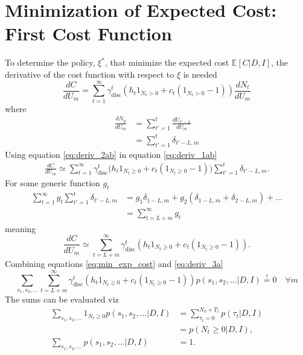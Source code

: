\section{Minimization of Expected Cost: First Cost Function}
\label{app:deriva}
To determine the policy, $\xi^*$, that minimize the expected cost $\mathbb{E}[C|D,I]$, the derivative of the cost function with respect to $\xi$ is needed
\begin{equation}
		\frac{dC}{dU_m} = \sum_{t=1}^{\infty} \gamma_{\text{disc}}^{t} \left( h_t 1_{N_t> 0} + c_t (1_{N_t> 0}-1) \right)\frac{dN_t}{dU_m}
	\label{eq:deriv_1ab}
\end{equation}
where
\begin{equation}
	\begin{split}
		\frac{dN_q}{dU_m} &= \sum_{t'=1}^t\frac{dU_{t'-L}}{dU_m}\\
		& = \sum_{t'=1}^t\delta_{t'-L,m}
	\label{eq:deriv_2ab}
	\end{split}
\end{equation}
Using equation \eqref{eq:deriv_2ab} in equation \eqref{eq:deriv_1ab} 
\begin{equation}
	\begin{split}
		\frac{dC}{dU_m} \simeq \sum_{t=1}^{\infty}\gamma_{\text{disc}}^{t}\bigg(h_t1_{N_t\geq 0}+c_t(1_{N_t\geq 0}-1)\bigg)\sum_{t'=1}^t\delta_{t'-L,m}.
	\end{split}
\end{equation}
For some generic function $g_t$
\begin{equation}
	\begin{split}
		\sum_{t=1}^{\infty}g_t\sum_{t'=1}^t\delta_{t'-L,m} & = g_1\delta_{1-L,m}+g_2(\delta_{1-L,m}+\delta_{2-L,m})+\dots\\
		&=\sum_{t=L+m}^\infty g_t
	\end{split}
\end{equation}
meaning
\begin{equation}
	\frac{dC}{dU_m} \simeq \sum_{t=L+m}^{\infty}\gamma_{\text{disc}}^{t}(h_t1_{N_t\geq 0}+c_t(1_{N_t\geq 0}-1)).
	\label{eq:deriv_3a}
\end{equation}
Combining equations \eqref{eq:min_exp_cost} and \eqref{eq:deriv_3a}
\begin{equation}
	\sum_{s_1,s_2,\dots}\sum_{t=L+m}^{\infty}\gamma_{\text{disc}}^{t}(h_t1_{N_{t}\geq 0}+c_t(1_{N_{t}\geq 0}-1))p(s_1,s_{2},\dots|D,I)\overset{!}{=} 0\quad \forall m
\end{equation}
The sums can be evaluated viz
\begin{equation}
	\begin{split}
		\sum_{s_1,s_2,\dots}1_{N_{t}\geq 0}p(s_1,s_{2},\dots|D,I) &= \sum_{\tau_t=0}^{N_0+\Upsilon_t}p(\tau_t|D,I)\\
		&= p(N_t\geq 0|D,I),\\
		\sum_{s_1,s_2,\dots}p(s_1,s_{2},\dots|D,I)&=1.\\
	\end{split}
\end{equation}
